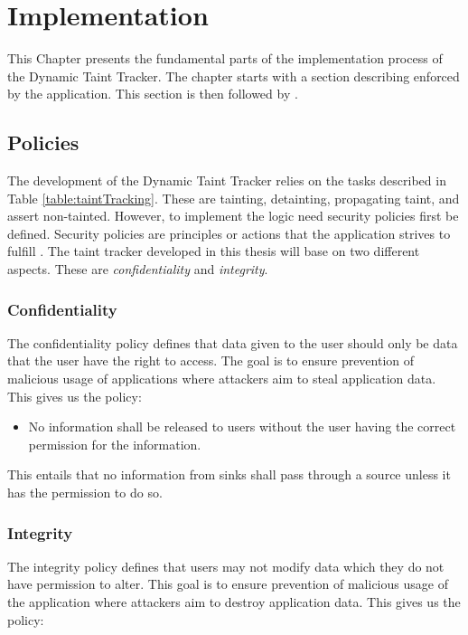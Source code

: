 \chapter{Implementation}
This Chapter presents the fundamental parts of the implementation process of the Dynamic Taint Tracker. The chapter starts with a section describing \textit{} enforced by the application. This section is then followed by \textit{}.



\section{Policies}
\label{Policies}
The development of the Dynamic Taint Tracker relies on the tasks described in Table \ref{table:taintTracking}. These are tainting, detainting, propagating taint, and assert non-tainted. However, to implement the logic need security policies first be defined. Security policies are principles or actions that the application strives to fulfill \parencite{BayukJenniferL2012Cspg}. The taint tracker developed in this thesis will base on two different aspects. These are \textit{confidentiality} and \textit{integrity}.



\subsection{Confidentiality}
The confidentiality policy defines that data given to the user should only be data that the user have the right to access. The goal is to ensure prevention of malicious usage of applications where attackers aim to steal application data. This gives us the policy:

\begin{itemize}
    \item No information shall be released to users without the user having the correct permission for the information.
\end{itemize}
\hfill

This entails that no information from sinks shall pass through a source unless it has the permission to do so.



\subsection{Integrity}
The integrity policy defines that users may not modify data which they do not have permission to alter. This goal is to ensure prevention of malicious usage of the application where attackers aim to destroy application data. This gives us the policy:

